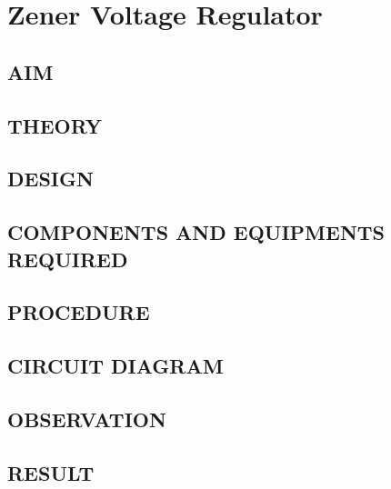 \chapter[Zener Voltage Regulator]{Zener Voltage Regulator}
\section*[AIM]{AIM}
\section*[THEORY]{THEORY}
\section*[DESIGN]{DESIGN}
\section*[COMPONENTS AND EQUIPMENTS REQUIRED]{COMPONENTS AND EQUIPMENTS REQUIRED}
\section*[PROCEDURE]{PROCEDURE}
\section*[CIRCUIT DIAGRAM]{CIRCUIT DIAGRAM}
\section*[OBSERVATION]{OBSERVATION}
\section*[RESULT]{RESULT}
